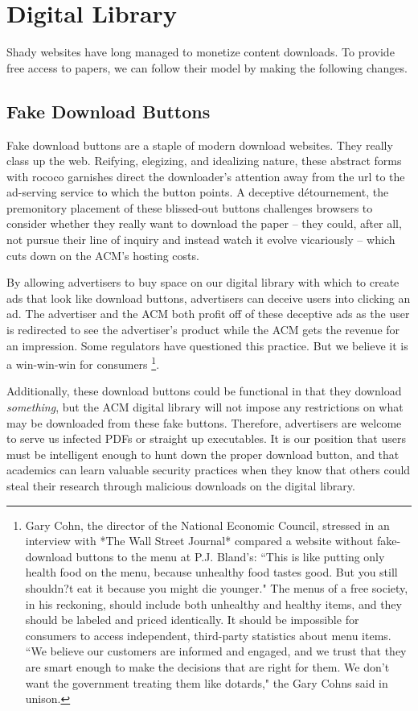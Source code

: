 \section{Digital Library}
Shady websites have long managed to monetize content downloads.
To provide free access to papers, we can follow their model by making the
following changes.

\subsection{Fake Download Buttons}

Fake download buttons are a staple of modern download websites. They really class up the web. Reifying, elegizing, and idealizing nature, these abstract forms with rococo garnishes direct the downloader's attention away from the url to the ad-serving service to which the button points. A deceptive d\'{e}tournement, the premonitory placement of these blissed-out buttons challenges browsers to consider whether they really want to download the paper -- they could, after all, not pursue their line of inquiry and instead watch it evolve vicariously -- which cuts down on the ACM's hosting costs.

By allowing advertisers to buy space on our digital library with which to
create ads that look like download buttons, advertisers can deceive users into
clicking an ad.
The advertiser and the ACM both profit off of these deceptive ads as the user
is redirected to see the advertiser's product while the ACM gets the revenue
for an impression. Some regulators have questioned this practice. But we believe it is a win-win-win for consumers \footnote{Gary Cohn, the director of the National Economic Council, stressed in an interview with *The Wall Street Journal* compared a website without fake-download buttons to the menu at P.J. Bland's: ``This is like putting only health food on the menu, because unhealthy food tastes good. But you still shouldn?t eat it because you might die younger." The menus of a free society, in his reckoning, should include both unhealthy and healthy items, and they should be labeled and priced identically. It should be impossible for consumers to access independent, third-party statistics about menu items. ``We believe our customers are informed and engaged, and we trust that they are smart enough to make the decisions that are right for them. We don't want the government treating them like dotards," the Gary Cohns said in unison.}.


Additionally, these download buttons could be functional in that they download
\textit{something}, but the ACM digital library will not impose any
restrictions on what may be downloaded from these fake buttons.
Therefore, advertisers are welcome to serve us infected PDFs or straight up
executables.
It is our position that users must be intelligent enough to hunt down the
proper download button, and that academics can learn valuable security
practices when they know that others could steal their research through
malicious downloads on the digital library.

